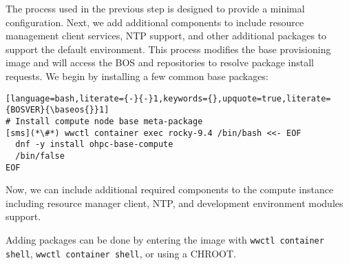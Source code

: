 The process used in the previous step is designed to
provide a minimal \baseOS{} configuration. Next, we add additional components
to include resource management client services, NTP support, and
other additional packages to support the default \OHPC{} environment. This
process modifies the base provisioning image and will access the BOS and \OHPC{}
repositories to resolve package install requests. We begin by installing a few
common base packages:

\begin{lstlisting}[language=bash,literate={-}{-}1,keywords={},upquote=true,literate={BOSVER}{\baseos{}}1]
# Install compute node base meta-package
[sms](*\#*) wwctl container exec rocky-9.4 /bin/bash <<- EOF
  dnf -y install ohpc-base-compute
  /bin/false
EOF
\end{lstlisting}

\noindent Now, we can include additional required components to the compute
instance including resource manager client, NTP, and development environment modules support.

Adding packages can be done by entering the image with \texttt{wwctl container shell},
\texttt{wwctl container shell}, or using a CHROOT.

